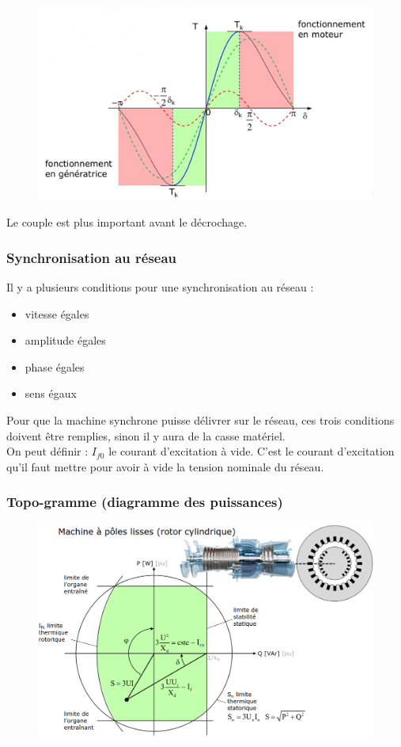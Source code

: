 \documentclass[../main.tex]{subfiles}
\begin{document}
\begin{figure}[hbt!]
    \centering
    \includegraphics[width=.6\textwidth]{IMAGES/machineelec/IMG_0147.jpeg}
\end{figure}

Le couple est plus important avant le décrochage.\\
\subsubsection{Synchronisation au réseau}
Il y a plusieurs conditions pour une synchronisation au réseau : \begin{itemize}
    \item vitesse égales\\
    \item amplitude égales\\
    \item phase égales\\
    \item sens égaux\\
\end{itemize}

Pour que la machine synchrone puisse délivrer sur le réseau, ces trois conditions doivent être remplies, sinon il y aura de la casse matériel. \\

On peut définir : $I_{f0}$ le courant d'excitation à vide. C'est le courant d'excitation qu'il faut mettre pour avoir à vide la tension nominale du réseau.\\

\subsubsection{Topo-gramme (diagramme des puissances)}

\begin{figure}[hbt!]
    \centering
    \includegraphics[width=.7\textwidth]{IMAGES/machineelec/Screenshot from 2023-11-16 23-32-03.png}
\end{figure}
\end{document}
